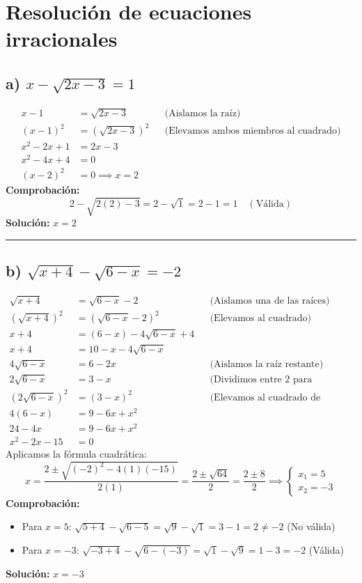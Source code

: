 \documentclass{article}
\begin{document}
\section*{Resolución de ecuaciones irracionales}

\subsection*{a) $x - \sqrt{2x - 3} = 1$}
\begin{align*}
x - 1 &= \sqrt{2x - 3} && \text{(Aislamos la raíz)} \\
(x - 1)^2 &= \left(\sqrt{2x - 3}\right)^2 && \text{(Elevamos ambos miembros al cuadrado)} \\
x^2 - 2x + 1 &= 2x - 3 \\
x^2 - 4x + 4 &= 0 \\
(x - 2)^2 &= 0 \implies x = 2
\end{align*}
\textbf{Comprobación:}
\[
2 - \sqrt{2(2) - 3} = 2 - \sqrt{1} = 2 - 1 = 1 \quad (\text{Válida})
\]
\textbf{Solución:} $x = 2$

\hrule

\subsection*{b) $\sqrt{x + 4} - \sqrt{6 - x} = -2$}
\begin{align*}
\sqrt{x + 4} &= \sqrt{6 - x} - 2 && \text{(Aislamos una de las raíces)} \\
\left(\sqrt{x + 4}\right)^2 &= \left(\sqrt{6 - x} - 2\right)^2 && \text{(Elevamos al cuadrado)} \\
x + 4 &= (6 - x) - 4\sqrt{6 - x} + 4 \\
x + 4 &= 10 - x - 4\sqrt{6 - x} \\
4\sqrt{6 - x} &= 6 - 2x && \text{(Aislamos la raíz restante)} \\
2\sqrt{6 - x} &= 3 - x && \text{(Dividimos entre 2 para simplificar)} \\
\left(2\sqrt{6 - x}\right)^2 &= (3 - x)^2 && \text{(Elevamos al cuadrado de nuevo)} \\
4(6 - x) &= 9 - 6x + x^2 \\
24 - 4x &= 9 - 6x + x^2 \\
x^2 - 2x - 15 &= 0
\end{align*}
Aplicamos la fórmula cuadrática:
\[
x = \frac{2 \pm \sqrt{(-2)^2 - 4(1)(-15)}}{2(1)} = \frac{2 \pm \sqrt{64}}{2} = \frac{2 \pm 8}{2} \implies 
\begin{cases} 
x_1 = 5 \\ 
x_2 = -3 
\end{cases}
\]
\textbf{Comprobación:}
\begin{itemize}
    \item Para $x = 5$: $\sqrt{5 + 4} - \sqrt{6 - 5} = \sqrt{9} - \sqrt{1} = 3 - 1 = 2 \neq -2$ (No válida)
    \item Para $x = -3$: $\sqrt{-3 + 4} - \sqrt{6 - (-3)} = \sqrt{1} - \sqrt{9} = 1 - 3 = -2$ (Válida)
\end{itemize}
\textbf{Solución:} $x = -3$
\end{document}
